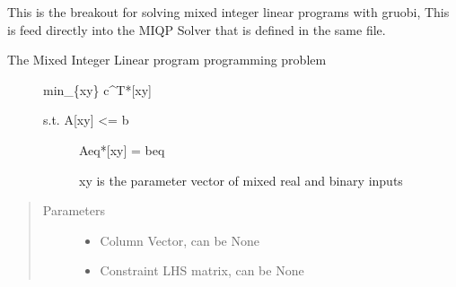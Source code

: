 \documentclass[letterpaper,10pt,english]{sphinxmanual}
\begin{document}
\begin{fulllineitems}
\label{\detokenize{mpo.solver_interface:mpo.solver_interface.solver_interface.solve_lp}}
\sphinxAtStartPar
This is the breakout for solving mixed integer linear programs with gruobi, This is feed directly into the
MIQP Solver that is defined in the same file.
\begin{description}
\item[{The Mixed Integer Linear program programming problem}] \leavevmode
\sphinxAtStartPar
min\_\{xy\} c\textasciicircum{}T*{[}xy{]}
\begin{description}
\item[{s.t.    A{[}xy{]} \textless{}= b}] \leavevmode
\sphinxAtStartPar
Aeq*{[}xy{]} = beq

\sphinxAtStartPar
xy is the parameter vector of mixed real and binary inputs

\end{description}

\end{description}
\begin{quote}\begin{description}
\item[{Parameters}] \leavevmode\begin{itemize}
\item {} 
\sphinxAtStartPar
{} \textendash{} Column Vector, can be None

\item {} 
\sphinxAtStartPar
{} \textendash{} Constraint LHS matrix, can be None


\end{itemize}
\end{description}
\end{quote}
\end{fulllineitems}
\end{document}
